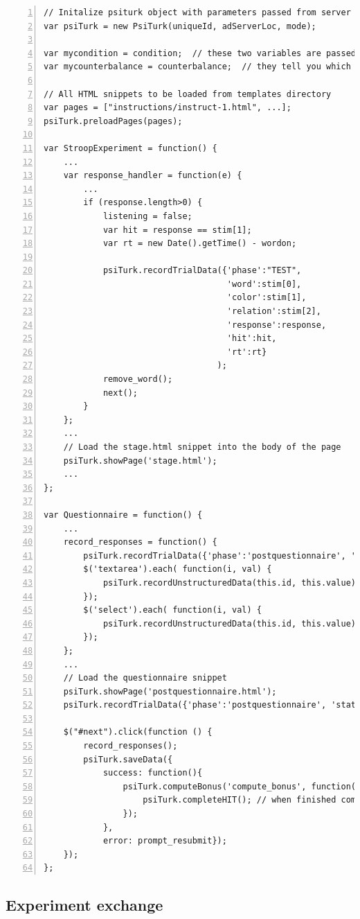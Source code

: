 \documentclass[twocolumn]{svjour3}          %
\begin{document}
\begin{lstlisting}[float=*,numbers=left,numberstyle=\small\color{gray},caption=Condensed version of JavaScript code for Stroop experiment,label=code.lst]
// Initalize psiturk object with parameters passed from server (see templates/exp.html)
var psiTurk = new PsiTurk(uniqueId, adServerLoc, mode);

var mycondition = condition;  // these two variables are passed by the psiturk server process
var mycounterbalance = counterbalance;  // they tell you which condition you have been assigned to

// All HTML snippets to be loaded from templates directory
var pages = ["instructions/instruct-1.html", ...];
psiTurk.preloadPages(pages);

var StroopExperiment = function() {
	...	
	var response_handler = function(e) {
		...
		if (response.length>0) {
			listening = false;
			var hit = response == stim[1];
			var rt = new Date().getTime() - wordon;

			psiTurk.recordTrialData({'phase':"TEST",
                                     'word':stim[0],
                                     'color':stim[1],
                                     'relation':stim[2],
                                     'response':response,
                                     'hit':hit,
                                     'rt':rt}
                                   );
			remove_word();
			next();
		}
	};
	...	
	// Load the stage.html snippet into the body of the page
	psiTurk.showPage('stage.html');
	...
};

var Questionnaire = function() {
	...
	record_responses = function() {
		psiTurk.recordTrialData({'phase':'postquestionnaire', 'status':'submit'});
		$('textarea').each( function(i, val) {
			psiTurk.recordUnstructuredData(this.id, this.value);
		});
		$('select').each( function(i, val) {
			psiTurk.recordUnstructuredData(this.id, this.value);		
		});
	};
	... 
	// Load the questionnaire snippet 
	psiTurk.showPage('postquestionnaire.html');
	psiTurk.recordTrialData({'phase':'postquestionnaire', 'status':'begin'});
	
	$("#next").click(function () {
		record_responses();	
		psiTurk.saveData({
			success: function(){
			    psiTurk.computeBonus('compute_bonus', function() { 
			    	psiTurk.completeHIT(); // when finished computing bonus, quit
			    }); 
			}, 
			error: prompt_resubmit});
	});
};
\end{lstlisting}

\subsection{Experiment exchange}
\end{document}
